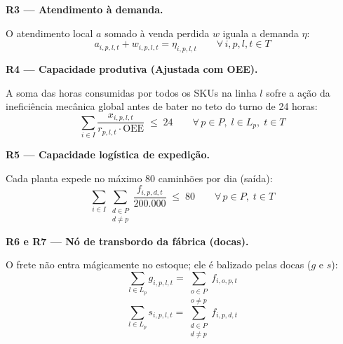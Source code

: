 \documentclass[12pt, a4paper]{article}
\begin{document}
\vspace{8pt}

\begin{mdframed}[style=destaque]
\textbf{\color{ballblue}R3 --- Atendimento \`{a} demanda.}
\medskip

O atendimento local $a$ somado \`{a} venda perdida $w$ iguala a demanda $\eta$:
\[
  a_{i,p,l,t} + w_{i,p,l,t} = \eta_{i,p,l,t}
  \qquad \forall\, i, p, l, t \in T
\]
\end{mdframed}

\vspace{8pt}

\begin{mdframed}[style=destaque]
\textbf{\color{ballblue}R4 --- Capacidade produtiva (Ajustada com OEE).}
\medskip

A soma das horas consumidas por todos os SKUs na linha $l$ sofre a a\c{c}\~{a}o da inefici\^{e}ncia mec\^{a}nica global antes de bater no teto do turno de 24 horas:
\[
  \sum_{i \in I} \frac{x_{i,p,l,t}}{r_{p,l,t} \cdot \text{OEE}} \;\leq\; 24
  \qquad \forall\, p \in P,\; l \in L_p,\; t \in T
\]
\end{mdframed}

\vspace{8pt}

\begin{mdframed}[style=destaque]
\textbf{\color{ballblue}R5 --- Capacidade log\'{i}stica de expedi\c{c}\~{a}o.}
\medskip

Cada planta expede no m\'{a}ximo 80 caminh\~{o}es por dia (sa\'{i}da):
\[
  \sum_{i \in I} \sum_{\substack{d \in P \\ d \neq p}}
  \frac{f_{i,p,d,t}}{200{.}000} \;\leq\; 80
  \qquad \forall\, p \in P,\; t \in T
\]
\end{mdframed}

\vspace{8pt}

\begin{mdframed}[style=destaque]
\textbf{\color{ballblue}R6 e R7 --- N\'{o} de transbordo da f\'{a}brica (docas).}
\medskip

O frete n\~{a}o entra m\'{a}gicamente no estoque; ele \'{e} balizado pelas docas ($g$ e $s$):
\[
  \sum_{l \in L_p} g_{i,p,l,t} = \sum_{\substack{o \in P \\ o \neq p}} f_{i,o,p,t} \tag{R6}
\]
\[
  \sum_{l \in L_p} s_{i,p,l,t} = \sum_{\substack{d \in P \\ d \neq p}} f_{i,p,d,t} \tag{R7}
\]
\end{mdframed}
\end{document}

